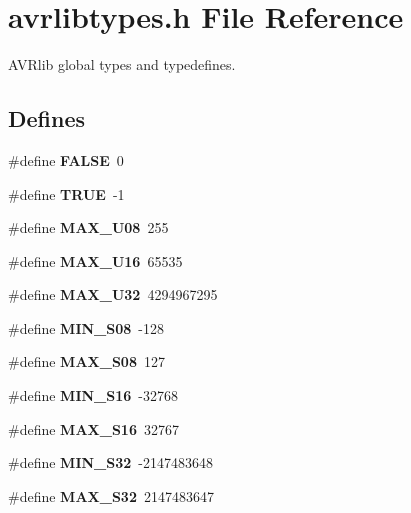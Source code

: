 \section{avrlibtypes.h File Reference}
\label{avrlibtypes_8h}
AVRlib global types and typedefines.  


\subsection*{Defines}
\begin{CompactItemize}
\item 
\#define \textbf{FALSE}~0\label{avrlibtypes_8h_a93f0eb578d23995850d61f7d61c55c1}

\item 
\#define \textbf{TRUE}~-1\label{avrlibtypes_8h_a8cecfc5c5c054d2875c03e77b7be15d}

\item 
\#define \textbf{MAX\_\-U08}~255\label{avrlibtypes_8h_f209b7ae7041a754270558c5bafbba8a}

\item 
\#define \textbf{MAX\_\-U16}~65535\label{avrlibtypes_8h_7f0dfd7f13d36c40ffb909adfdb7af35}

\item 
\#define \textbf{MAX\_\-U32}~4294967295\label{avrlibtypes_8h_20b4183ab07f41e496119f451c134041}

\item 
\#define \textbf{MIN\_\-S08}~-128\label{avrlibtypes_8h_1b8b84a9eeb0be816b1f76e6a2c46f4c}

\item 
\#define \textbf{MAX\_\-S08}~127\label{avrlibtypes_8h_c230e69af12a638f6ff73041794926f3}

\item 
\#define \textbf{MIN\_\-S16}~-32768\label{avrlibtypes_8h_74bade79717cab9e52bc89dd085c6e6f}

\item 
\#define \textbf{MAX\_\-S16}~32767\label{avrlibtypes_8h_7c0820d7cc1159cb658281c8d08f130e}

\item 
\#define \textbf{MIN\_\-S32}~-2147483648\label{avrlibtypes_8h_fbba66fcb199cf13330cc678960a7e7a}

\item 
\#define \textbf{MAX\_\-S32}~2147483647\label{avrlibtypes_8h_9d45091964bbb21641595ab37f2067f3}

\end{CompactItemize}
